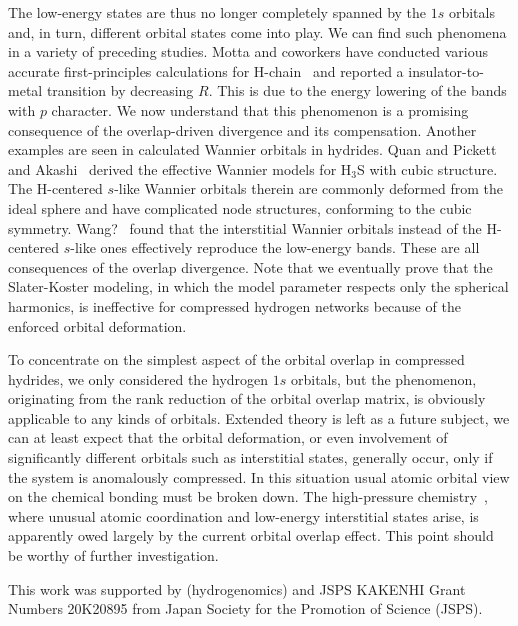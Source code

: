 \documentclass[twocolumn,showpacs,prb,amsfonts,amsmath,amssymb,floatfix,groupedaddress]{revtex4-1}
\begin{document}
The low-energy states are thus no longer completely spanned by the $1s$ orbitals and, in turn, different orbital states come into play. We can find such phenomena in a variety of preceding studies. Motta and coworkers have conducted various accurate first-principles calculations for H-chain~\cite{} and reported a insulator-to-metal transition by decreasing $R$. This is due to the energy lowering of the bands with $p$ character. We now understand that this phenomenon is a promising consequence of the overlap-driven divergence and its compensation. Another examples are seen in calculated Wannier orbitals in hydrides. Quan and Pickett~\cite{} and Akashi~\cite{} derived the effective Wannier models for H$_{3}$S with cubic structure. The H-centered $s$-like Wannier orbitals therein are commonly deformed from the ideal sphere and have complicated node structures, conforming to the cubic symmetry. Wang?~\cite{} found that the interstitial Wannier orbitals instead of the H-centered $s$-like ones effectively reproduce the low-energy bands. These are all consequences of the overlap divergence. Note that we eventually prove that the Slater-Koster modeling, in which the model parameter respects only the spherical harmonics, is ineffective for compressed hydrogen networks because of the enforced orbital deformation. 

To concentrate on the simplest aspect of the orbital overlap in compressed hydrides, we only considered the hydrogen $1s$ orbitals, but the phenomenon, originating from the rank reduction of the orbital overlap matrix, is obviously applicable to any kinds of orbitals. Extended theory is left as a future subject, we can at least expect that the orbital deformation, or even involvement of significantly different orbitals such as interstitial states, generally occur, only if the system is anomalously compressed. In this situation usual atomic orbital view on the chemical bonding must be broken down. The high-pressure chemistry~,\cite{} where unusual atomic coordination and low-energy interstitial states arise, is apparently owed largely by the current orbital overlap effect. This point should be worthy of further investigation.

\begin{acknowledgments}
This work was supported by (hydrogenomics) and JSPS KAKENHI Grant Numbers 20K20895 from Japan Society for the Promotion of Science (JSPS). 
\end{acknowledgments}


\end{document}
